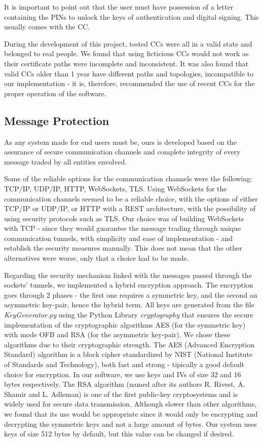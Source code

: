 \documentclass[a4paper]{article}
\begin{document}
It is important to point out that the user must have possession of a letter containing the PINs to unlock the keys of authentication and digital signing. This usually comes with the CC.

During the development of this project, tested CCs were all in a valid state and belonged to real people.
We found that using ficticious CCs would not work as their certificate paths were incomplete and inconsistent.
It was also found that valid CCs older than 1 year have different paths and topologies, incompatible to our implementation - it is, therefore, recommended the use of recent CCs for the proper operation of the software.

\subsection{Message Protection}

As any system made for end users must be, ours is developed based on the assurance of secure communication channels and complete integrity of every message traded by all entities envolved.

Some of the reliable options for the communication channels were the following: TCP/IP, UDP/IP, HTTP, WebSockets, TLS.
Using WebSockets for the communication channels seemed to be a reliable choice, with the options of either TCP/IP or UDP/IP, or HTTP with a REST architecture, with the possibility of using security protocols such as TLS.
Our choice was of building WebSockets with TCP - since they would guarantee the message trading through unique communication tunnels, with simplicity and ease of implementation - and establish the security measures manually.
This does not mean that the other alternatives were worse, only that a choice had to be made. 

Regarding the security mechanism linked with the messages passed through the sockets' tunnels, we implemented a hybrid encryption approach. 
The encryption goes through 2 phases - the first one requires a symmetric key, and the second an asymmetric key-pair, hence the hybrid term.
All keys are generated from the file \emph{KeyGenerator.py} using the Python Library \emph{cryptography} that ensures the secure implementation of the cryptographic algorithms AES (for the symmetric key) with mode OFB and RSA (for the asymmetric key-pair). 
We chose these algorithms due to their cryptographic strength. 
The AES (Advanced Encryption Standard) algorithm is a block cipher standardized by NIST (National Institute of Standards and Technology), both fast and strong - tipically a good default choice for encryption. 
In our software, we use keys and IVs of size 32 and 16 bytes respectively.
The RSA algorithm (named after its authors R. Rivest, A. Shamir and L. Adleman) is one of the first public-key cryptosystems and is widely used for secure data transmission. 
Although slower than other algorithms, we found that its use would be appropriate since it would only be encrypting and decrypting the symmetric keys and not a large amount of bytes. 
Our system uses keys of size 512 bytes by default, but this value can be changed if desired.
\end{document}
